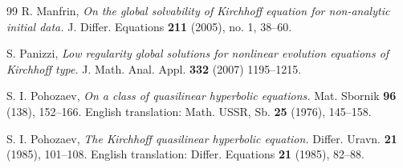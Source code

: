 \documentclass{amsart}
\theoremstyle{definition}
\numberwithin{equation}{section}
\begin{document}
\begin{thebibliography}{99}
R. Manfrin,
\emph{On the global solvability of Kirchhoff equation for non-analytic initial data.}
J. Differ. Equations \textbf{211} (2005), no. 1, 38--60.

%

S. Panizzi,
\emph{Low regularity global solutions for nonlinear evolution equations of Kirchhoff type.}
{J. Math. Anal. Appl.} \textbf{332} (2007) 1195--1215.

S. I. Pohozaev, 
\emph{On a class of quasilinear hyperbolic equations.}
Mat. Sbornik \textbf{96} (138), 152--166.
English translation: 
Math. USSR, Sb. \textbf{25} (1976), 145--158.

S. I. Pohozaev, 
\emph{The Kirchhoff quasilinear hyperbolic equation.}
Differ. Uravn. \textbf{21} (1985), 101--108.
English translation:
Differ. Equations \textbf{21} (1985), 82--88. 

\end{thebibliography}
\end{document}
